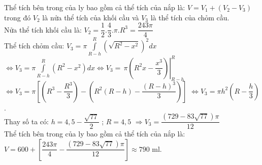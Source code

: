 \begin{ex}
{	Thể tích bên trong của ly bao gồm cả thể tích của nắp là: $V=V_1+\left(V_2-V_3\right)$ trong đó $V_2$ là nửa thể tích của khối cầu và $V_3$ là thể tích của chỏm cầu.\\
	Nửa thể tích khối cầu là: $V_2=\dfrac{1}{2}.\dfrac{4}{3}.\pi .R^3=\dfrac{243\pi}{4}$\\
	Thể tích chỏm cầu: $V_3=\pi\displaystyle\int\limits_{R-h}^R{\left(\sqrt{R^2-x^2}\right)^2dx}$ $\Leftrightarrow{V_3}=\pi\displaystyle\int\limits_{R-h}^R{\left(R^2-x^2\right)dx\Leftrightarrow{V_3}=\,}\pi\left.\left(R^2x-\dfrac{x^3}{3}\right)\right|_{R-h}^R$\\
	$\Leftrightarrow{V_3}=\pi\left[\left(R^3-\dfrac{R^3}{3}\right)-\left(R^2\left(R-h\right)-\dfrac{\left(R-h\right)^3}{3}\right)\right]$ $\Leftrightarrow{V_3}=\pi{h^2}\left(R-\dfrac{h}{3}\right)$ .\\
	Thay số ta có: $h=4,5-\dfrac{\sqrt{77}}{2}$ ; $R=4,5$ $\Rightarrow{V_3}=\dfrac{\left(729-83\sqrt{77}\right)\pi}{12}$\\
	Thể tích bên trong của ly bao gồm cả thể tích của nắp là:\\
	$V=600+\left[\dfrac{243\pi}{4}-\dfrac{\left(729-83\sqrt{77}\right)\pi}{12}\right]\approx 790$ ml.}
\end{ex}

